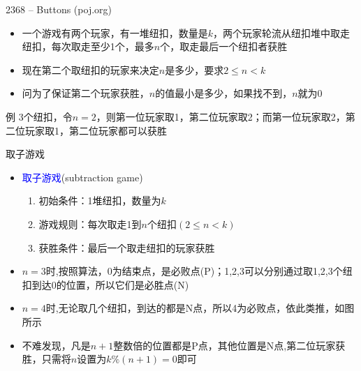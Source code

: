 \begin{frame}{2368 -- Buttons (poj.org)}
    \begin{itemize}
        \item 一个游戏有两个玩家，有一堆纽扣，数量是$k$，两个玩家轮流从纽扣堆中取走纽扣，每次取走至少1个，最多$n$个，取走最后一个纽扣者获胜
        \item 现在第二个取纽扣的玩家来决定$n$是多少，要求$2 \leq n < k$
        \item 问为了保证第二个玩家获胜，$n$的值最小是多少，如果找不到，$n$就为0
    \end{itemize}
    \begin{exampleblock}{例}
        3个纽扣，令$n=2$，则第一位玩家取1，第二位玩家取2；而第一位玩家取2，第二位玩家取1，第二位玩家都可以获胜
    \end{exampleblock}
\end{frame}
\begin{frame}{取子游戏}
    \begin{itemize}
        \item \textcolor{blue}{取子游戏}(subtraction game)
        \begin{enumerate}[(1)]
            \item 初始条件：1堆纽扣，数量为$k$
            \item 游戏规则：每次取走1到$n$个纽扣$(2\leq n < k)$
            \item 获胜条件：最后一个取走纽扣的玩家获胜
        \end{enumerate}
        \item $n=3$时,按照算法，0为结束点，是必败点(P)；1,2,3可以分别通过取1,2,3个纽扣到达0的位置，所以它们是必胜点(N)
        \item $n=4$时,无论取几个纽扣，到达的都是N点，所以4为必败点，依此类推，如图所示
        \vfill
        \item 不难发现，凡是$n+1$整数倍的位置都是P点，其他位置是N点,第二位玩家获胜，只需将$n$设置为$k\%(n+1)=0$即可   
    \end{itemize}
\end{frame}
